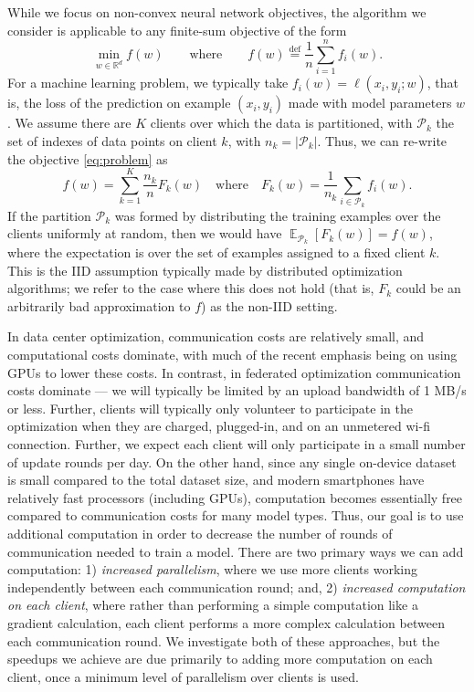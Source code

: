 \documentclass[twoside]{article}
\newcommand{\eqdef}{\overset{\text{def}}{=}}
\newcommand{\nc}{K}
\newcommand{\pp}{\mathcal{P}}
\newcommand{\R}{\ensuremath{\mathbb{R}}}
\newcommand{\qqwhere}{\qquad \text{where} \qquad}
\DeclareMathOperator*{\E}{\mathbb{E}}
\begin{document}
While we focus on non-convex neural network objectives, the algorithm
we consider is applicable to any finite-sum objective of the form
\begin{equation}
\label{eq:problem}
\min_{w \in \R^d} f(w)
\qqwhere
f(w) \eqdef \frac{1}{n} \sum_{i=1}^n f_i(w).
\end{equation}
For a machine learning problem, we typically take $f_i(w) = \ell(x_i,
y_i; w)$, that is, the loss of the prediction on example $(x_i, y_i)$
made with model parameters $w$.
We assume there are $\nc$ clients over which the data is partitioned,
with $\pp_k$ the set of indexes of data points on client $k$, with $n_k
= |\pp_k|$.  Thus, we can re-write the objective \eqref{eq:problem} as
\begin{equation*}
\label{eq:problem:distributed}
f(w) = \sum_{k = 1}^K \frac{n_k}{n} F_k(w)
\quad \text{where} \quad
F_k(w) = \frac{1}{n_k} \sum_{i \in \mathcal{P}_k} f_i(w).
\end{equation*}
If the partition $\pp_k$ was formed by distributing the training
examples over the clients uniformly at random, then we would have
$\E_{\pp_k}[F_k(w)] = f(w)$, where the expectation is over the set of
examples assigned to a fixed client $k$. This is the IID assumption
typically made by distributed optimization algorithms; we refer to the
case where this does not hold (that is, $F_k$ could be an arbitrarily
bad approximation to $f$) as the non-IID setting.

In data center optimization, communication costs are relatively small,
and computational costs dominate, with much of the recent emphasis
being on using GPUs to lower these costs. In contrast, in federated
optimization communication costs dominate --- we will typically be
limited by an upload bandwidth of 1 MB/s or less. Further, clients
will typically only volunteer to participate in the optimization when
they are charged, plugged-in, and on an unmetered wi-fi
connection. Further, we expect each client will only participate in a
small number of update rounds per day.
On the other hand, since any single on-device dataset is small
compared to the total dataset size, and modern smartphones have
relatively fast processors (including GPUs), computation becomes
essentially free compared to communication costs for many model
types. Thus, our goal is to use additional computation in order to
decrease the number of rounds of communication needed to train a
model. There are two primary ways we can add computation:
1) \emph{increased parallelism}, where we use more clients working
  independently between each communication round; and, 2)
\emph{increased computation on each client}, where rather than
  performing a simple computation like a gradient calculation, each
  client performs a more complex calculation between each
  communication round.
We investigate both of these approaches, but the speedups we achieve
are due primarily to adding more computation on each client, once a
minimum level of parallelism over clients is used.
\end{document}
